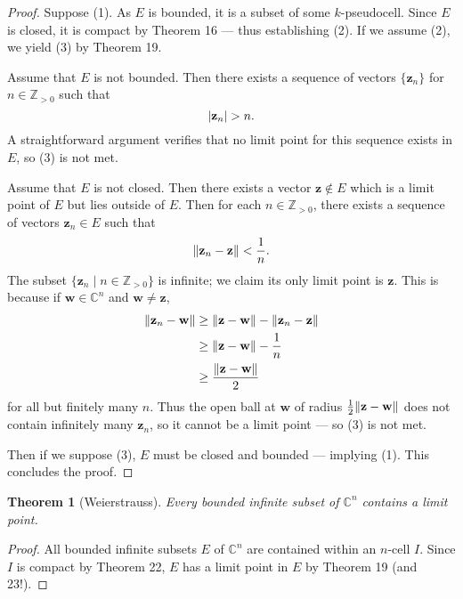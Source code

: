 \documentclass[11pt]{article}
\renewcommand{\vec}[1]{\mathbf{#1}}
\newtheorem{theorem}{Theorem}
\begin{document}
\begin{adjustwidth}{1cm}{}
	\begin{proof}
		Suppose (1). As $E$ is bounded, it is a subset of some $k$-pseudocell. Since $E$ is closed, it is compact by Theorem 16 --- thus establishing (2). If we assume (2), we yield (3) by Theorem 19.

		Assume that $E$ is not bounded. Then there exists a sequence of vectors $\{ \vec{z}_{n} \}$ for $n \in \mathbb{Z}_{> 0}$ such that
		\[
			\abs{\vec{z}_{n}} > n.
		\]
		A straightforward argument verifies that no limit point for this sequence exists in $E$, so (3) is not met.

		Assume that $E$ is not closed. Then there exists a vector $\vec{z} \notin E$ which is a limit point of $E$ but lies outside of $E$. Then for each $n \in \mathbb{Z}_{> 0}$, there exists a sequence of vectors $\vec{z}_{n} \in E$ such that
		\[
			\norm{\vec{z}_{n} - \vec{z}} < \frac{1}{n}.
		\]
		The subset $\{ \vec{z}_{n} \mid n \in \mathbb{Z}_{> 0} \}$ is infinite; we claim its only limit point is $\vec{z}$. This is because if $\vec{w} \in \mathbb{C}^{n}$ and $\vec{w} \ne \vec{z}$,
		\begin{align*}
			\norm{\vec{z}_{n} - \vec{w}} &\ge \norm{\vec{z} - \vec{w}} - \norm{\vec{z}_{n} - \vec{z}} \\
			&\ge \norm{\vec{z} - \vec{w}} - \frac{1}{n} \\
			&\ge \frac{\norm{\vec{z} - \vec{w}}}{2}
		\end{align*}
		for all but finitely many $n$. Thus the open ball at $\vec{w}$ of radius $\tfrac{1}{2} \norm{\vec{z} - \vec{w}}$ does not contain infinitely many $\vec{z}_{n}$, so it cannot be a limit point --- so (3) is not met.
		
		Then if we suppose (3), $E$ must be closed and bounded --- implying (1). This concludes the proof.
	\end{proof}
\end{adjustwidth}

\begin{theorem}[Weierstrauss]
	Every bounded infinite subset of $\mathbb{C}^{n}$ contains a limit point.
\end{theorem}
\begin{adjustwidth}{1cm}{}
	\begin{proof}
		All bounded infinite subsets $E$ of $\mathbb{C}^{n}$ are contained within an $n$-cell $I$. Since $I$ is compact by Theorem 22, $E$ has a limit point in $E$ by Theorem 19 (and 23!).
	\end{proof}
\end{adjustwidth}

\end{document}
